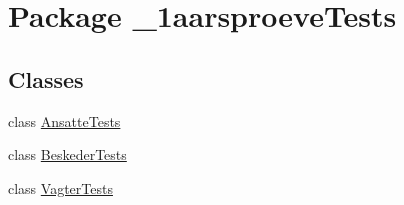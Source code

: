 \hypertarget{namespace__1aarsproeve_tests}{}\section{Package \+\_\+1aarsproeve\+Tests}
\label{namespace__1aarsproeve_tests}
\subsection*{Classes}
\begin{DoxyCompactItemize}
\item 
class \hyperlink{class__1aarsproeve_tests_1_1_ansatte_tests}{Ansatte\+Tests}
\item 
class \hyperlink{class__1aarsproeve_tests_1_1_beskeder_tests}{Beskeder\+Tests}
\item 
class \hyperlink{class__1aarsproeve_tests_1_1_vagter_tests}{Vagter\+Tests}
\end{DoxyCompactItemize}
